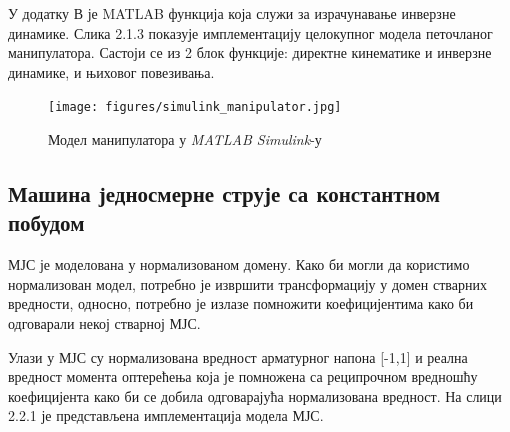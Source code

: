 \documentclass[12pt]{article}
\begin{document}
У додатку В је MATLAB функција која служи за израчунавање инверзне динамике.
Слика 2.1.3 показује имплементацију целокупног модела петочланог манипулатора. Састоји се из 2 блок функције: директне кинематике и инверзне динамике, и њиховог повезивања.

\begin{figure}[H]
    \centering
    \texttt{[image: figures/simulink\_manipulator.jpg]}
    \caption{Модел манипулатора у \textit{MATLAB Simulink}-у}
    \label{fig:манипулатор_simulink}
\end{figure}

\subsection{Машина једносмерне струје са константном побудом}
МЈС је моделована у нормализованом домену. Како би могли да користимо нормализован модел, потребно је извршити трансформацију у домен стварних вредности, односно, потребно је излазе помножити коефицијентима како би одговарали некој стварној МЈС.

Улази у МЈС су нормализована вредност арматурног напона [-1,1] и реална вредност момента оптерећења која је помножена са реципрочном вредношћу коефицијента како би се добила одговарајућа нормализована вредност. На слици 2.2.1 је представљена имплементација модела МЈС.
\end{document}
